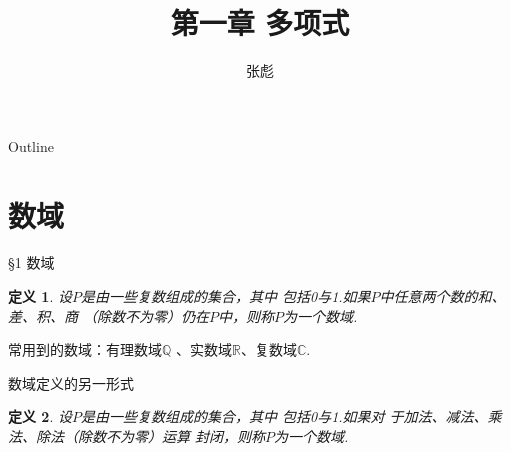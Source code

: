 \documentclass[13pt,fontset=mac]{ctexbeamer}
\newtheorem*{defi}{定义}
\begin{document}
\title[]{第一章 \quad 多项式}
\author[]{{\large 张彪}\\  }

\date{}


\AtBeginSection[]
{
\setcounter{exa}{0}
\setcounter{equation}{0}
}


\begin{frame}
\maketitle
\end{frame}

\begin{frame}{Outline}
	\tableofcontents
\end{frame}

\section{数域}
\begin{frame}{\S 1    数域}

\begin{defi}
设$P$是由一些复数组成的集合，其中
	包括0与1.如果$P$中任意两个数的和、差、积、商
	（除数不为零）仍在$P$中，则称$P$为一个数域.
\end{defi}

   常用到的数域：有理数域$\mathbb{Q}$ 、实数域$\mathbb{R}$、复数域$\mathbb{C}$.

   \vspace{10pt}
数域定义的另一形式
\begin{defi}
	设$P$是由一些复数组成的集合，其中
	包括0与1.如果对
	于加法、减法、乘法、除法（除数不为零）运算
	封闭，则称$P$为一个数域.
\end{defi}


\end{frame}
\end{document}
